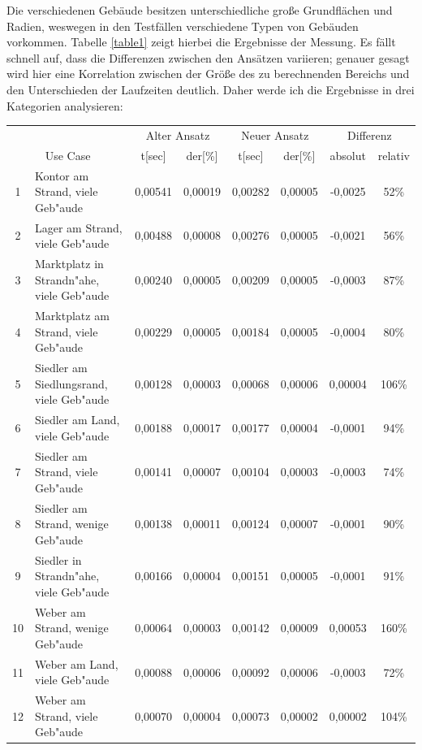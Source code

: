 \documentclass[%
			paper=a4,%
			DIV12,
			liststotoc,
			bibtotoc,
			draft=false,%
			titlepage,
			numbers=noendperiod
			]{scrartcl}
\begin{document}
Die verschiedenen Gebäude besitzen unterschiedliche große Grundflächen und Radien, weswegen
in den Testfällen verschiedene Typen von Gebäuden vorkommen.
Tabelle \ref{table1} zeigt hierbei die Ergebnisse der Messung.
Es fällt schnell auf, dass die Differenzen zwischen den Ansätzen variieren;
genauer gesagt wird hier eine Korrelation zwischen der Größe des zu berechnenden Bereichs und den Unterschieden der Laufzeiten deutlich. Daher werde ich die Ergebnisse in drei Kategorien analysieren:



\begin{center}
	\begin{table}[htpb]
		\begin{tabularx}{\textwidth}{|cX|cc|cc|cc|}
			\hline
			& & \multicolumn{2}{c|}{Alter Ansatz} & \multicolumn{2}{c|}{Neuer Ansatz} & \multicolumn{2}{c|}{Differenz}\\
			\multicolumn{2}{|c|}{Use Case} & t[sec] & der[\%] & t[sec] & der[\%] & absolut & relativ \\
			\hline
1 & Kontor am Strand, viele Geb"aude & 0,00541 & 0,00019 & 0,00282 & 0,00005 & -0,0025 & 52\%\\
2 & Lager am Strand, viele Geb"aude & 0,00488 & 0,00008 & 0,00276 & 0,00005 & -0,0021 & 56\%\\
3 & Marktplatz in Strandn"ahe, viele Geb"aude & 0,00240 & 0,00005 & 0,00209 & 0,00005 & -0,0003 & 87\%\\
4 & Marktplatz am Strand, viele Geb"aude & 0,00229 & 0,00005 & 0,00184 & 0,00005 & -0,0004 & 80\%\\
5 & Siedler am Siedlungsrand, viele Geb"aude & 0,00128 & 0,00003 & 0,00068 & 0,00006 & 0,00004 & 106\%\\
6 & Siedler am Land, viele Geb"aude & 0,00188 & 0,00017 & 0,00177 & 0,00004 & -0,0001 & 94\%\\
7 & Siedler am Strand, viele Geb"aude & 0,00141 & 0,00007 & 0,00104 & 0,00003 & -0,0003 & 74\%\\
8 & Siedler am Strand, wenige Geb"aude & 0,00138 & 0,00011 & 0,00124 & 0,00007 & -0,0001 & 90\%\\
9 & Siedler in Strandn"ahe, viele Geb"aude & 0,00166 & 0,00004 & 0,00151 & 0,00005 & -0,0001 & 91\%\\
10 & Weber am Strand, wenige Geb"aude & 0,00064 & 0,00003 & 0,00142 & 0,00009 & 0,00053 & 160\%\\
11 & Weber am Land, viele Geb"aude & 0,00088 & 0,00006 & 0,00092 & 0,00006 & -0,0003 & 72\%\\
12 & Weber am Strand, viele Geb"aude & 0,00070 & 0,00004 & 0,00073 & 0,00002 & 0,00002 & 104\%\\


\end{tabularx}
\end{table}
\end{center}
\end{document}
